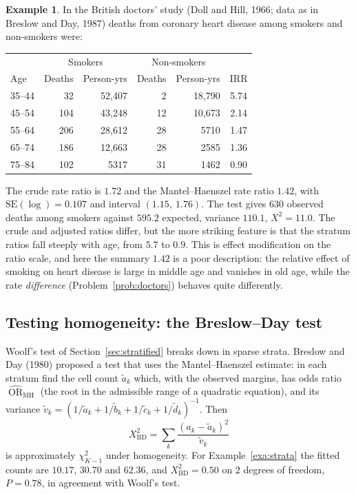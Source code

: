 \documentclass[11pt,a4paper]{article}
\numberwithin{equation}{section}
\DeclareMathOperator{\OR}{OR}
\theoremstyle{definition}
\newtheorem{exa}[thm]{Example}
\begin{document}
\begin{exa}
\label{exa:doctors}
In the British doctors' study (Doll and Hill, 1966; data as in Breslow and Day, 1987) deaths from coronary heart disease among smokers
and non-smokers were:
\begin{center}
\begin{tabular}{lrrrrc}
\hline
 & \multicolumn{2}{c}{Smokers} & \multicolumn{2}{c}{Non-smokers} & \\
Age & Deaths & Person-yrs & Deaths & Person-yrs & IRR \\
\hline
35--44 & 32 & 52{,}407 & 2 & 18{,}790 & 5.74 \\
45--54 & 104 & 43{,}248 & 12 & 10{,}673 & 2.14 \\
55--64 & 206 & 28{,}612 & 28 & 5710 & 1.47 \\
65--74 & 186 & 12{,}663 & 28 & 2585 & 1.36 \\
75--84 & 102 & 5317 & 31 & 1462 & 0.90 \\
\hline
\end{tabular}
\end{center}
The crude rate ratio is $1.72$ and the Mantel--Haenszel rate ratio $1.42$, with $\text{SE}(\log) = 0.107$ and interval $(1.15,\ 1.76)$. The test gives
$630$ observed deaths among smokers against $595.2$ expected, variance $110.1$, $X^2 = 11.0$. The crude and adjusted ratios differ, but the more striking feature is that the stratum
ratios fall steeply with age, from $5.7$ to $0.9$. This is effect modification
on the ratio scale, and here the summary $1.42$ is a poor description: the relative effect of smoking on heart disease is large in middle age
and vanishes in old age, while the rate \emph{difference} (Problem~\ref{prob:doctors}) behaves quite differently.
\end{exa}

\subsection{Testing homogeneity: the Breslow--Day test}

Woolf's test of Section~\ref{sec:stratified} breaks down in sparse strata. Breslow and Day (1980) proposed a test that uses the
Mantel--Haenszel estimate: in each stratum find the cell count $\tilde a_k$ which, with the observed margins, has odds ratio $\widehat{\OR}_{\text{MH}}$ (the root
in the admissible range of a quadratic equation), and its variance $\tilde v_k = (1/\tilde a_k + 1/\tilde b_k + 1/\tilde c_k + 1/\tilde d_k)^{-1}$. Then
\[
X^2_{\text{BD}} = \sum_k \frac{(a_k - \tilde a_k)^2}{\tilde v_k}
\]
is approximately $\chi^2_{K - 1}$ under homogeneity. For Example~\ref{exa:strata} the fitted counts are $10.17$, $30.70$ and $62.36$, and $X^2_{\text{BD}} = 0.50$ on $2$ degrees
of freedom, $P = 0.78$, in agreement with Woolf's test.
\end{document}
